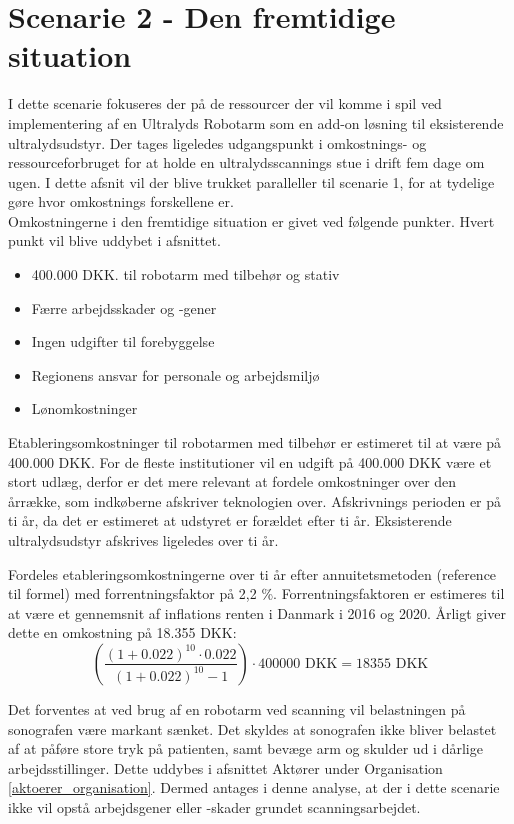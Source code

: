 \section{Scenarie 2 - Den fremtidige situation}
I dette scenarie fokuseres der på de ressourcer der vil komme i spil ved implementering af en Ultralyds Robotarm som en add-on løsning til eksisterende ultralydsudstyr. Der tages ligeledes udgangspunkt i omkostnings- og ressourceforbruget for at holde en ultralydsscannings stue i drift fem dage om ugen. I dette afsnit vil der blive trukket paralleller til scenarie 1, for at tydelige gøre hvor omkostnings forskellene er. \\
Omkostningerne i den fremtidige situation er givet ved følgende punkter. Hvert punkt vil blive uddybet i afsnittet.
\begin{itemize}
\item 400.000 DKK. til robotarm med tilbehør og stativ
\item Færre arbejdsskader og -gener
\item Ingen udgifter til forebyggelse
\item Regionens ansvar for personale og arbejdsmiljø
\item Lønomkostninger
\end{itemize}
Etableringsomkostninger til robotarmen med tilbehør er estimeret til at være på 400.000 DKK. For de fleste institutioner vil en udgift på 400.000 DKK være et stort udlæg, derfor er det mere relevant at fordele omkostninger over den årrække, som indkøberne afskriver teknologien over. Afskrivnings perioden er på ti år, da det er estimeret at udstyret er forældet efter ti år. Eksisterende ultralydsudstyr afskrives ligeledes over ti år. 

Fordeles etableringsomkostningerne over ti år efter annuitetsmetoden (reference til formel) med forrentningsfaktor på 2,2 \%. Forrentningsfaktoren er estimeres til at være et gennemsnit af inflations renten i Danmark i 2016 og 2020. Årligt giver dette en omkostning på 18.355 DKK:
\begin{equation}
\left(\frac{(1+0.022)^{10}\cdot0.022}{(1+0.022)^{10}-1}\right)\cdot400000 \text{ DKK}=18355 \text{ DKK}
\end{equation}

Det forventes at ved brug af en robotarm ved scanning vil belastningen på sonografen være markant sænket. Det skyldes at sonografen ikke bliver belastet af at påføre store tryk på patienten, samt bevæge arm og skulder ud i dårlige arbejdsstillinger. Dette uddybes i afsnittet Aktører under Organisation \ref{aktoerer_organisation}. Dermed antages i denne analyse, at der i dette scenarie ikke vil opstå arbejdsgener eller -skader grundet scanningsarbejdet. 

